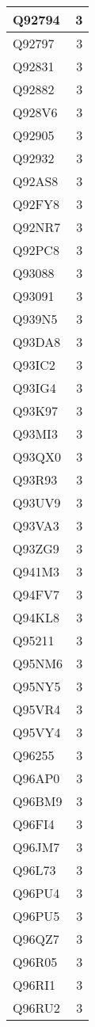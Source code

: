 \documentclass[
]{book}
\theoremstyle{definition}
\theoremstyle{definition}
\theoremstyle{definition}
\theoremstyle{definition}
\theoremstyle{remark}
\begin{document}
\begin{table}
\begin{tabular}{l|r}
\hline
Q92794 & 3\\
\hline
Q92797 & 3\\
\hline
Q92831 & 3\\
\hline
Q92882 & 3\\
\hline
Q928V6 & 3\\
\hline
Q92905 & 3\\
\hline
Q92932 & 3\\
\hline
Q92AS8 & 3\\
\hline
Q92FY8 & 3\\
\hline
Q92NR7 & 3\\
\hline
Q92PC8 & 3\\
\hline
Q93088 & 3\\
\hline
Q93091 & 3\\
\hline
Q939N5 & 3\\
\hline
Q93DA8 & 3\\
\hline
Q93IC2 & 3\\
\hline
Q93IG4 & 3\\
\hline
Q93K97 & 3\\
\hline
Q93MI3 & 3\\
\hline
Q93QX0 & 3\\
\hline
Q93R93 & 3\\
\hline
Q93UV9 & 3\\
\hline
Q93VA3 & 3\\
\hline
Q93ZG9 & 3\\
\hline
Q941M3 & 3\\
\hline
Q94FV7 & 3\\
\hline
Q94KL8 & 3\\
\hline
Q95211 & 3\\
\hline
Q95NM6 & 3\\
\hline
Q95NY5 & 3\\
\hline
Q95VR4 & 3\\
\hline
Q95VY4 & 3\\
\hline
Q96255 & 3\\
\hline
Q96AP0 & 3\\
\hline
Q96BM9 & 3\\
\hline
Q96FI4 & 3\\
\hline
Q96JM7 & 3\\
\hline
Q96L73 & 3\\
\hline
Q96PU4 & 3\\
\hline
Q96PU5 & 3\\
\hline
Q96QZ7 & 3\\
\hline
Q96R05 & 3\\
\hline
Q96RI1 & 3\\
\hline
Q96RU2 & 3\\

\end{tabular}
\end{table}
\end{document}
